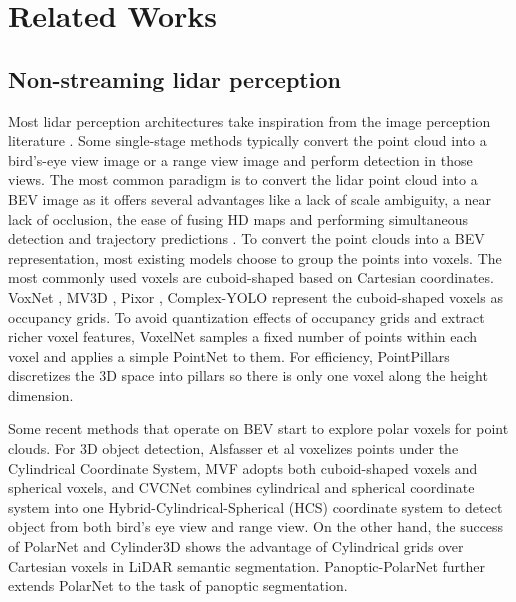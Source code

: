 \documentclass{article}
\begin{document}
\vspace{-4mm}\section{Related Works}\vspace{-3mm}
\label{related}
\subsection{Non-streaming lidar perception}\vspace{-2mm}

Most lidar perception architectures take inspiration from the image perception literature \cite{ren2016faster,liu2016ssd,lin2017focal}. Some single-stage methods typically convert the point cloud into a bird's-eye view image \cite{zhou2018voxelnet,lang2019pointpillars,yang2018pixor} or a range view image \cite{meyer2019lasernet,fan2021rangedet} and perform detection in those views. The most common paradigm is to convert the lidar point cloud into a BEV image as it offers several advantages like a lack of scale ambiguity, a near lack of occlusion, the ease of fusing HD maps \cite{hdnet} and performing simultaneous detection and trajectory predictions \cite{intentnet, fnf}. To convert the point clouds into a BEV representation, most existing models choose to group the points into voxels. The most commonly used voxels are cuboid-shaped based on Cartesian coordinates. VoxNet \cite{maturana2015voxnet}, MV3D \cite{mv3d}, Pixor \cite{pixor}, Complex-YOLO \cite{complexyolo} represent the cuboid-shaped voxels as occupancy grids. To avoid quantization effects of occupancy grids and extract richer voxel features, VoxelNet \cite{zhou2018voxelnet} samples a fixed number of points within each voxel and applies a simple PointNet \cite{qi2017pointnet} to them. For efficiency, PointPillars \cite{lang2019pointpillars} discretizes the 3D space into pillars so there is only one voxel along the height dimension. 



\vspace{-1mm}
Some recent methods that operate on BEV start to explore polar voxels for point clouds. For 3D object detection, Alsfasser et al \cite{alsfasser2020exploiting} voxelizes points under the Cylindrical Coordinate System, MVF \cite{zhou2019end} adopts both cuboid-shaped voxels and spherical voxels, and CVCNet combines cylindrical and spherical coordinate system into one Hybrid-Cylindrical-Spherical (HCS) coordinate system to detect object from both bird's eye view and range view. On the other hand, the success of PolarNet \cite{zhang2020polarnet} and Cylinder3D \cite{zhou2020cylinder3d} shows the advantage of Cylindrical grids over Cartesian voxels in LiDAR semantic segmentation. Panoptic-PolarNet \cite{zhou2021panoptic} further extends PolarNet to the task of panoptic segmentation.
\end{document}
